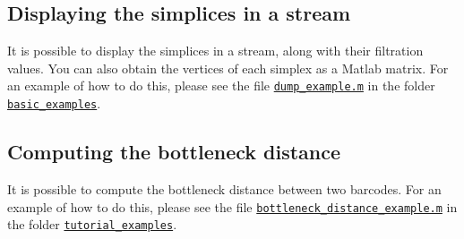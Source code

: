 \documentclass[amscd, amssymb, verbatim]{amsart}[12pt]
\theoremstyle{remark}
\theoremstyle{remark}
\theoremstyle{remark}
\begin{document}
\subsection{Displaying the simplices in a stream}

It is possible to display the simplices in a stream, along with their filtration values. You can also obtain the vertices of each simplex as a Matlab matrix. For an example of how to do this, please see the file \href{https://github.com/appliedtopology/javaplex/blob/master/src/matlab/for_distribution/basic_examples/dump_example.m}{\texttt{dump\_example.m}} in the folder \href{https://github.com/appliedtopology/javaplex/tree/master/src/matlab/for_distribution/basic_examples}{\texttt{basic\_examples}}.


\subsection{Computing the bottleneck distance}

It is possible to compute the bottleneck distance between two barcodes. For an example of how to do this, please see the file \href{https://github.com/appliedtopology/javaplex/tree/master/src/matlab/for_distribution/tutorial_examples/bottleneck_distance_example.m}{\texttt{bottleneck\_distance\_example.m}} in the folder \href{https://github.com/appliedtopology/javaplex/tree/master/src/matlab/for_distribution/tutorial_examples}{\texttt{tutorial\_examples}}.



\end{document}
